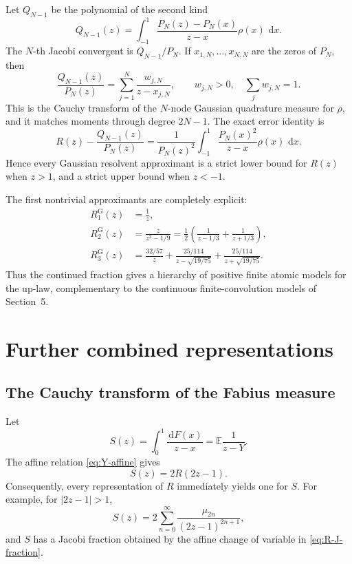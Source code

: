 \documentclass[11pt]{article}
\theoremstyle{definition}
\theoremstyle{remark}
\newcommand{\E}{\mathbb E}
\newcommand{\dd}{\,\mathrm d}
\begin{document}
Let \(Q_{N-1}\) be the polynomial of the second kind
\begin{equation}
 Q_{N-1}(z)=\int_{-1}^{1}
 \frac{P_N(z)-P_N(x)}{z-x}\rho(x)\,\dd x.                    \label{eq:second-kind}
\end{equation}
The \(N\)-th Jacobi convergent is \(Q_{N-1}/P_N\).  If
\(x_{1,N},\dots,x_{N,N}\) are the zeros of \(P_N\), then
\begin{equation}
 \boxed{
 \frac{Q_{N-1}(z)}{P_N(z)}
 =\sum_{j=1}^{N}\frac{w_{j,N}}{z-x_{j,N}},
 \qquad w_{j,N}>0,\quad \sum_jw_{j,N}=1.
 }                                                           \label{eq:gauss-partial}
\end{equation}
This is the Cauchy transform of the \(N\)-node Gaussian quadrature measure for \(\rho\),
and it matches moments through degree \(2N-1\).  The exact error identity is
\begin{equation}
 R(z)-\frac{Q_{N-1}(z)}{P_N(z)}
 =\frac1{P_N(z)^2}\int_{-1}^{1}
 \frac{P_N(x)^2}{z-x}\rho(x)\,\dd x.                        \label{eq:Markov-error}
\end{equation}
Hence every Gaussian resolvent approximant is a strict lower bound for \(R(z)\) when
\(z>1\), and a strict upper bound when \(z<-1\).

The first nontrivial approximants are completely explicit:
\begin{align}
 R_1^{\mathrm G}(z)&=\frac1z,\\
 R_2^{\mathrm G}(z)&=\frac{z}{z^2-1/9}
 =\frac12\left(\frac1{z-1/3}+\frac1{z+1/3}\right),\\
 R_3^{\mathrm G}(z)&=
 \frac{32/57}{z}
 +\frac{25/114}{z-\sqrt{19/75}}
 +\frac{25/114}{z+\sqrt{19/75}}.
\end{align}
Thus the continued fraction gives a hierarchy of positive finite atomic models for the
up-law, complementary to the continuous finite-convolution models of Section~5.

\section{Further combined representations}

\subsection{The Cauchy transform of the Fabius measure}

Let
\begin{equation}
 S(z)=\int_0^1\frac{\dd F(x)}{z-x}=\E\frac1{z-Y}.            \label{eq:S-def}
\end{equation}
The affine relation \eqref{eq:Y-affine} gives
\begin{equation}
 \boxed{S(z)=2R(2z-1).}                                     \label{eq:S-R}
\end{equation}
Consequently, every representation of \(R\) immediately yields one for \(S\).  For example,
for \(|2z-1|>1\),
\begin{equation}
 S(z)=2\sum_{n=0}^{\infty}\frac{\mu_{2n}}{(2z-1)^{2n+1}},   \label{eq:S-moment}
\end{equation}
and \(S\) has a Jacobi fraction obtained by the affine change of variable in
\eqref{eq:R-J-fraction}.
\end{document}
